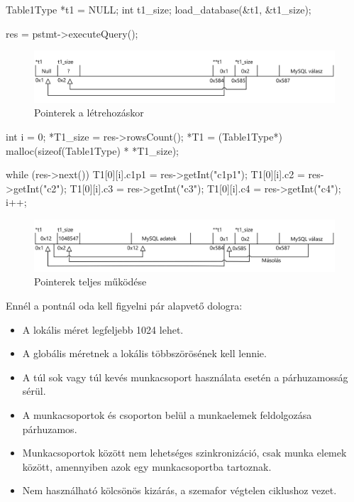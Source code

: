 \begin{cpp}
Table1Type *t1 = NULL;
int t1_size;
load_database(&t1, &t1_size);
	
res = pstmt->executeQuery();
\end{cpp}
\begin{figure}[h!]
\centering
\includegraphics[width=\textwidth]{images/implementation/pointer_01.png}
\caption{Pointerek a létrehozáskor}
\label{fig:opencl}
\end{figure}
\begin{cpp}
int i = 0;
*T1_size = res->rowsCount();
*T1 = (Table1Type*) malloc(sizeof(Table1Type) * *T1_size);

while (res->next()) {
  T1[0][i].c1p1 = res->getInt("c1p1"); T1[0][i].c2 = res->getInt("c2");
  T1[0][i].c3 = res->getInt("c3"); T1[0][i].c4 = res->getInt("c4");
  i++;
}
\end{cpp}
\begin{figure}[h!]
\centering
\includegraphics[width=\textwidth]{images/implementation/pointer_02.png}
\caption{Pointerek teljes működése}
\label{fig:opencl}
\end{figure}

Ennél a pontnál oda kell figyelni pár alapvető dologra:
\begin{itemize}
\item A lokális méret legfeljebb 1024 lehet.
\item A globális méretnek a lokális többszörösének kell lennie.
\item A túl sok vagy túl kevés munkacsoport használata esetén a párhuzamosság sérül.
\item A munkacsoportok és csoporton belül a munkaelemek feldolgozása párhuzamos.
\item Munkacsoportok között nem lehetséges szinkronizáció, csak munka elemek között, amennyiben azok egy munkacsoportba tartoznak.
\item Nem használható kölcsönös kizárás, a szemafor végtelen ciklushoz vezet.
\end{itemize}

